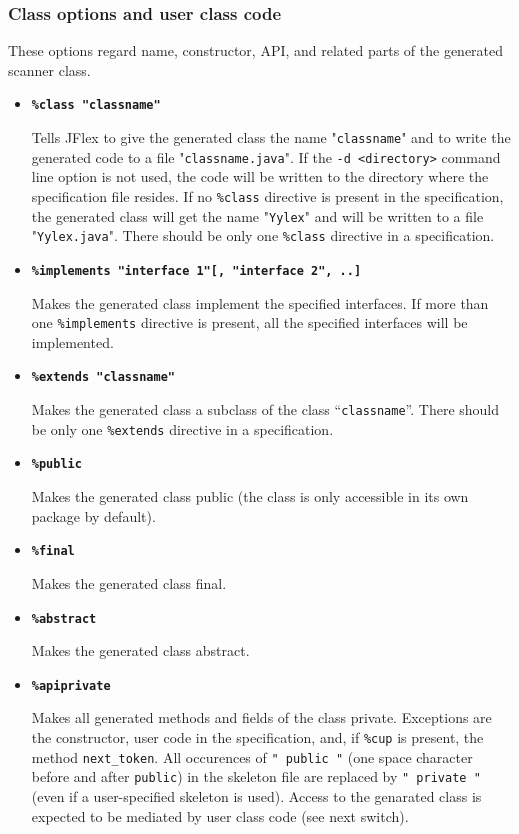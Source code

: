 \documentclass[11pt]{scrartcl}
\begin{document}
\subsubsection{Class options and user class code\label{ClassOptions}}
These options regard name, constructor, API, and related parts of the
generated scanner class.
\begin{itemize}
\item
{\bf \texttt{\%class "classname"}}

Tells JFlex to give the generated class the name "\texttt{classname}" and to
write the generated code to a file "\texttt{classname.java}". If the 
\texttt{-d <directory>} command line option is not used, the code
will be written to the directory where the specification file resides. If
no \texttt{\%class} directive is present in the specification, the generated
class will get the name "\texttt{Yylex}" and will be written to a file
"\texttt{Yylex.java}". There should be only one \texttt{\%class} directive
in a specification.
 
\item
{\bf \texttt{\%implements "interface 1"[, "interface 2", ..]}}

Makes the generated class implement the specified interfaces. If more than
one \texttt{\%imple\-ments} directive is present, all the specified interfaces 
will be implemented.
 
\item
{\bf \texttt{\%extends "classname"}}

Makes the generated class a subclass of the class ``\texttt{classname}''.
There should be only one \texttt{\%extends} directive in a specification.

\item
{\bf \texttt{\%public}}

Makes the generated class public (the class is only accessible in its
own package by default).

\item
{\bf \texttt{\%final}}

Makes the generated class final.

\item
{\bf \texttt{\%abstract}}

Makes the generated class abstract.
 
\item
{\bf \texttt{\%apiprivate}}

Makes all generated methods and fields of the class
private. Exceptions are the constructor, user code in the
specification, and, if \verb+%cup+ is present, the method
\texttt{next\_token}. All occurences of
\texttt{" public "} (one space character before and after \texttt{public})
in the skeleton file are replaced by
\texttt{" private "} (even if a user-specified skeleton is used).
Access to the genarated class is expected to be mediated by user class
code (see next switch).



\end{itemize}
\end{document}
